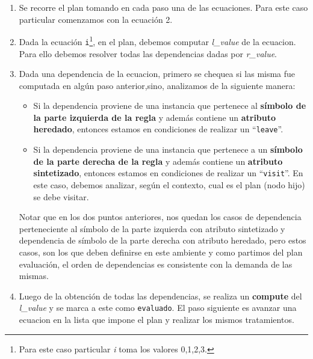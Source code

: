 \begin{enumerate}
\item Se recorre el plan tomando en cada paso una de las ecuaciones. Para este caso particular comenzamos con la ecuación 2.
\item Dada la ecuación \texttt{i}\footnote{Para este caso particular \textit{i} toma los valores 0,1,2,3.}, en el plan, debemos computar \textit{l\_value} de la ecuacion. Para ello debemos resolver todas las dependencias dadas por \textit{r\_value}.
\item Dada una dependencia de la ecuacion, primero se chequea si las misma fue computada en algún paso anterior,sino, analizamos de la siguiente manera:
\begin{itemize}
\item Si la dependencia proviene de una instancia que pertenece al \textbf{símbolo de la parte izquierda de la regla} y además contiene un \textbf{atributo heredado}, entonces estamos en condiciones de realizar un ``\texttt{leave}''.
\item Si la dependencia proviene de una instancia que pertenece a un \textbf{símbolo de la parte derecha de la regla} y además contiene un \textbf{atributo sintetizado}, entonces estamos en condiciones de realizar un ``\texttt{visit}''. En este caso, debemos analizar, según el contexto, cual es el plan (nodo hijo) se debe visitar. 
\end{itemize}
Notar que en los dos puntos anteriores, nos quedan los casos de dependencia perteneciente al símbolo de la parte izquierda con atributo sintetizado y dependencia de símbolo de la parte derecha con atributo heredado, pero estos casos, son los que deben definirse en este ambiente y como partimos del plan evaluación, el orden de dependencias es consistente con la demanda de las mismas.
\item Luego de la obtención de todas las dependencias, se realiza un \textbf{compute} del \textit{l\_value} y se marca a este como \texttt{evaluado}. El paso siguiente es avanzar una ecuacion en la lista que impone el plan y realizar los mismos tratamientos.
\end{enumerate} 

